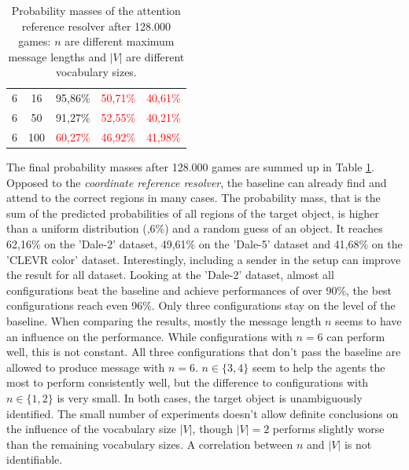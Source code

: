 \begin{table}[ht]
\begin{tabular}{cc|c|c|c}
        {6}                           & {16}      & {95,86\%}                           & \textcolor{red}{50,71\%}            & \textcolor{red}{40,61\%}                 \\
        {6}                           & {50}      & {91,27\%}                           & \textcolor{red}{52,55\%}            & \textcolor{red}{40,21\%}                 \\
        {6}                           & {100}     & \textcolor{red}{60,27\%}            & \textcolor{red}{46,92\%}            & \textcolor{red}{41,98\%}                 \\
        \bottomrule
    \end{tabular}
    \caption{Probability masses of the attention reference resolver after 128.000 games: $n$ are different maximum message lengths and $|V|$ are different vocabulary sizes.}
    \label{tab:results:attention-reference-resolver-game}
\end{table}

The final probability masses after 128.000 games are summed up in Table \ref{tab:results:attention-reference-resolver-game}.
Opposed to the \emph{coordinate reference resolver}, the baseline can already find and attend to the correct regions in many cases.
The probability mass, that is the sum of the predicted probabilities of all regions of the target object, is higher than a uniform distribution (,6\%) and a random guess of an object.
It reaches 62,16\% on the 'Dale-2' dataset, 49,61\% on the 'Dale-5' dataset and 41,68\% on the 'CLEVR color' dataset.
Interestingly, including a sender in the setup can improve the result for all dataset.
Looking at the 'Dale-2' dataset, almost all configurations beat the baseline and achieve performances of over 90\%, the best configurations reach even 96\%.
Only three configurations stay on the level of the baseline.
When comparing the results, mostly the message length $n$ seems to have an influence on the performance.
While configurations with $n=6$ can perform well, this is not constant.
All three configurations that don't pass the baseline are allowed to produce message with $n=6$.
$n \in \{3,4\}$ seem to help the agents the most to perform consistently well, but the difference to configurations with $n \in \{1,2\}$ is very small.
In both cases, the target object is unambiguously identified.
The small number of experiments doesn't allow definite conclusions on the influence of the vocabulary size $|V|$, though $|V|=2$ performs slightly worse than the remaining vocabulary sizes.
A correlation between $n$ and $|V|$ is not identifiable.

